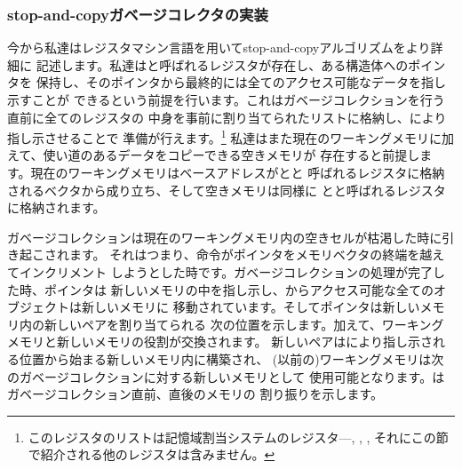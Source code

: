 \subsubsection*{stop-and-copyガベージコレクタの実装}

今から私達はレジスタマシン言語を用いてstop-and-copyアルゴリズムをより詳細に
記述します。私達はと呼ばれるレジスタが存在し、ある構造体へのポインタを
保持し、そのポインタから最終的には全てのアクセス可能なデータを指し示すことが
できるという前提を行います。これはガベージコレクションを行う直前に全てのレジスタの
中身を事前に割り当てられたリストに格納し、により指し示させることで
準備が行えます。\footnote{このレジスタのリストは記憶域割当システムのレジスタ---,
, , それにこの節で紹介される他のレジスタは含みません。}
私達はまた現在のワーキングメモリに加えて、使い道のあるデータをコピーできる空きメモリが
存在すると前提します。現在のワーキングメモリはベースアドレスがとと
呼ばれるレジスタに格納されるベクタから成り立ち、そして空きメモリは同様に
とと呼ばれるレジスタに格納されます。

ガベージコレクションは現在のワーキングメモリ内の空きセルが枯渇した時に引き起こされます。
それはつまり、命令がポインタをメモリベクタの終端を越えてインクリメント
しようとした時です。ガベージコレクションの処理が完了した時、ポインタは
新しいメモリの中を指し示し、からアクセス可能な全てのオブジェクトは新しいメモリに
移動されています。そしてポインタは新しいメモリ内の新しいペアを割り当てられる
次の位置を示します。加えて、ワーキングメモリと新しいメモリの役割が交換されます。
新しいペアはにより指し示される位置から始まる新しいメモリ内に構築され、
(以前の)ワーキングメモリは次のガベージコレクションに対する新しいメモリとして
使用可能となります。はガベージコレクション直前、直後のメモリの
割り振りを示します。

